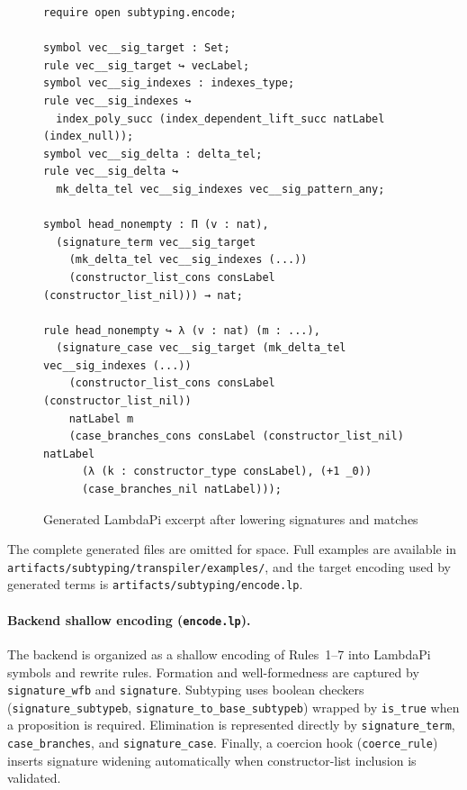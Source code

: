 \documentclass[a4paper, anonymous, UKenglish,cleveref, autoref, thm-restate]{lipics-v2021}
\begin{document}
\begin{figure}[!ht]
\begin{lstlisting}[language=Lambdapi, basicstyle={\ttfamily\scriptsize\upshape}, inputencoding=utf8, extendedchars=true]
require open subtyping.encode;

symbol vec__sig_target : Set;
rule vec__sig_target ↪ vecLabel;
symbol vec__sig_indexes : indexes_type;
rule vec__sig_indexes ↪
  index_poly_succ (index_dependent_lift_succ natLabel (index_null));
symbol vec__sig_delta : delta_tel;
rule vec__sig_delta ↪
  mk_delta_tel vec__sig_indexes vec__sig_pattern_any;

symbol head_nonempty : Π (v : nat),
  (signature_term vec__sig_target
    (mk_delta_tel vec__sig_indexes (...))
    (constructor_list_cons consLabel (constructor_list_nil))) → nat;

rule head_nonempty ↪ λ (v : nat) (m : ...),
  (signature_case vec__sig_target (mk_delta_tel vec__sig_indexes (...))
    (constructor_list_cons consLabel (constructor_list_nil))
    natLabel m
    (case_branches_cons consLabel (constructor_list_nil) natLabel
      (λ (k : constructor_type consLabel), (+1 _0))
      (case_branches_nil natLabel)));
\end{lstlisting}
\caption{Generated LambdaPi excerpt after lowering signatures and matches}
\label{fig:transpiler-output}
\end{figure}

The complete generated files are omitted for space. Full examples are available in \texttt{artifacts/subtyping/transpiler/examples/}, and the target encoding used by generated terms is \texttt{artifacts/subtyping/encode.lp}.

\paragraph*{Backend shallow encoding (\texttt{encode.lp}).}
The backend is organized as a shallow encoding of Rules~1--7 into LambdaPi symbols and rewrite rules. Formation and well-formedness are captured by \texttt{signature\_wfb} and \texttt{signature}. Subtyping uses boolean checkers (\texttt{signature\_subtypeb}, \texttt{signature\_to\_base\_subtypeb}) wrapped by \texttt{is\_true} when a proposition is required. Elimination is represented directly by \texttt{signature\_term}, \texttt{case\_branches}, and \texttt{signature\_case}. Finally, a coercion hook (\texttt{coerce\_rule}) inserts signature widening automatically when constructor-list inclusion is validated.
\end{document}
